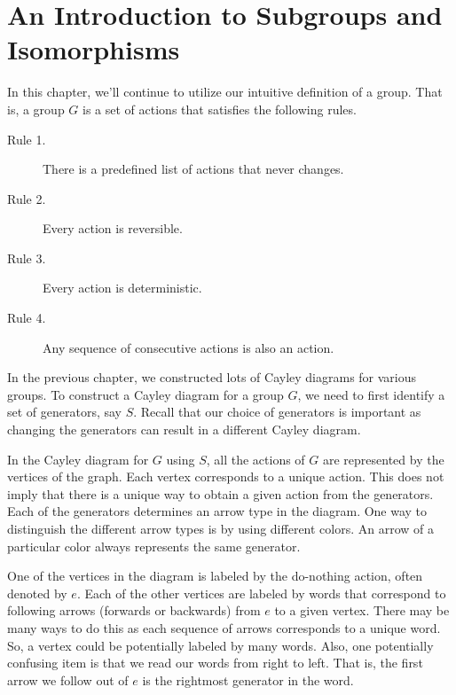 \chapter{An Introduction to Subgroups and Isomorphisms}
\label{chapter:intro_subgroups_isomorphisms}
\thispagestyle{empty}

In this chapter, we'll continue to utilize our intuitive definition of a group.  That is, a group $G$ is a set of actions that satisfies the following rules.

\begin{description}
\item[Rule 1.] There is a predefined list of actions that never changes.
\item[Rule 2.] Every action is reversible.
\item[Rule 3.] Every action is deterministic.
\item[Rule 4.] Any sequence of consecutive actions is also an action.
\end{description}

In the previous chapter, we constructed lots of Cayley diagrams for various groups.  To construct a Cayley diagram for a group $G$, we need to first identify a set of generators, say $S$.  Recall that our choice of generators is important as changing the generators can result in a different Cayley diagram.  

In the Cayley diagram for $G$ using $S$, all the actions of $G$ are represented by the vertices of the graph.  Each vertex corresponds to a unique action.  This does not imply that there is a unique way to obtain a given action from the generators.  Each of the generators determines an arrow type in the diagram.  One way to distinguish the different arrow types is by using different colors.  An arrow of a particular color always represents the same generator.

One of the vertices in the diagram is labeled by the do-nothing action, often denoted by $e$.  Each of the other vertices are labeled by words that correspond to following arrows (forwards or backwards) from $e$ to a given vertex.  There may be many ways to do this as each sequence of arrows corresponds to a unique word.  So, a vertex could be potentially labeled by many words.  Also, one potentially confusing item is that we read our words from right to left.  That is, the first arrow we follow out of $e$ is the rightmost generator in the word.

